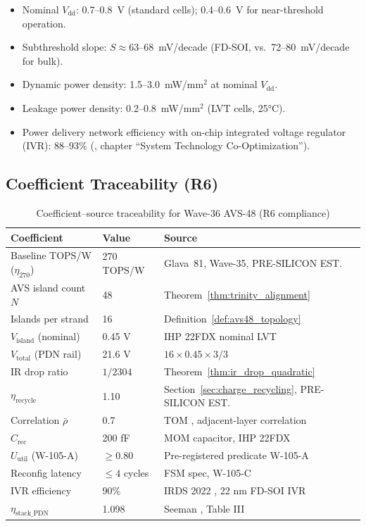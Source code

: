 \begin{itemize}
  \item Nominal $V_\mathrm{dd}$: 0.7--0.8~V (standard cells); 0.4--0.6~V
    for near-threshold operation.
  \item Subthreshold slope: $S \approx 63$--68~mV/decade (FD-SOI,
    vs.\ 72--80~mV/decade for bulk).
  \item Dynamic power density: 1.5--3.0~mW/mm$^2$ at nominal $V_\mathrm{dd}$.
  \item Leakage power density: 0.2--0.8~mW/mm$^2$ (LVT cells, 25°C).
  \item Power delivery network efficiency with on-chip integrated
    voltage regulator (IVR): 88--93\% (\cite{irds2023}, chapter
    ``System Technology Co-Optimization'').
\end{itemize}

\subsection{Coefficient Traceability (R6)}

\begin{table}[ht]
\centering
\caption{Coefficient--source traceability for Wave-36 AVS-48 (R6 compliance)}
\label{tab:coefficients_sources}
\begin{tabular}{p{4.5cm}p{2.5cm}p{5.5cm}}
\hline
Coefficient & Value & Source \\
\hline
Baseline TOPS/W ($\eta_{270}$) & 270 TOPS/W & Glava~81, Wave-35, PRE-SILICON EST. \\
AVS island count $N$ & 48 & Theorem~\ref{thm:trinity_alignment} \\
Islands per strand & 16 & Definition~\ref{def:avs48_topology} \\
$V_\mathrm{island}$ (nominal) & 0.45 V & IHP 22FDX nominal LVT \\
$V_\mathrm{total}$ (PDN rail) & 21.6 V & $16 \times 0.45 \times 3/3$ \\
IR drop ratio & $1/2304$ & Theorem~\ref{thm:ir_drop_quadratic} \\
$\eta_\mathrm{recycle}$ & 1.10 & Section~\ref{sec:charge_recycling}, PRE-SILICON EST. \\
Correlation $\bar{\rho}$ & 0.7 & TOM \cite{tom_arxiv_2602}, adjacent-layer correlation \\
$C_\mathrm{rec}$ & 200 fF & MOM capacitor, IHP 22FDX \\
$U_\mathrm{util}$ (W-105-A) & $\geq 0.80$ & Pre-registered predicate W-105-A \\
Reconfig latency & $\leq 4$ cycles & FSM spec, W-105-C \\
IVR efficiency & 90\% & IRDS 2022 \cite{irds2023}, 22 nm FD-SOI IVR \\
$\eta_\mathrm{stack\_PDN}$ & 1.098 & Seeman \cite{seeman_sc_2008}, Table III \\
\hline
\end{tabular}
\end{table}

